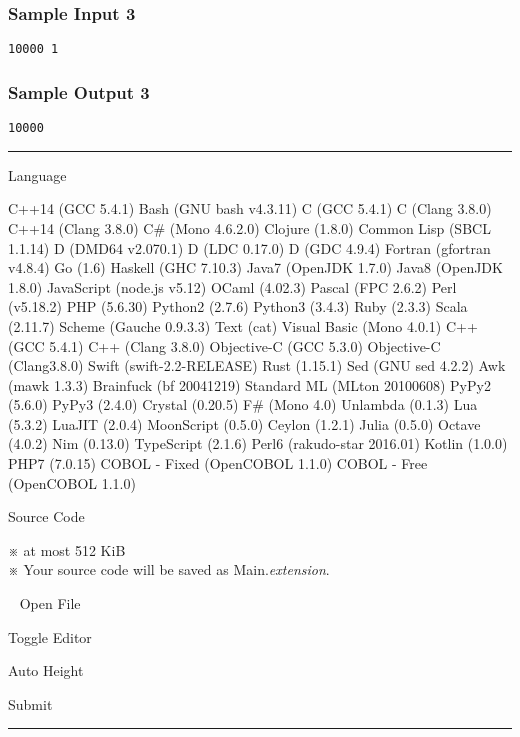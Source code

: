 \subsubsection{Sample Input 3}

\begin{verbatim}
10000 1
\end{verbatim}

\subsubsection{Sample Output 3}

\begin{verbatim}
10000
\end{verbatim}

\begin{center}\rule{0.5\linewidth}{\linethickness}\end{center}

Language

C++14 (GCC 5.4.1) Bash (GNU bash v4.3.11) C (GCC 5.4.1) C (Clang 3.8.0)
C++14 (Clang 3.8.0) C\# (Mono 4.6.2.0) Clojure (1.8.0) Common Lisp (SBCL
1.1.14) D (DMD64 v2.070.1) D (LDC 0.17.0) D (GDC 4.9.4) Fortran
(gfortran v4.8.4) Go (1.6) Haskell (GHC 7.10.3) Java7 (OpenJDK 1.7.0)
Java8 (OpenJDK 1.8.0) JavaScript (node.js v5.12) OCaml (4.02.3) Pascal
(FPC 2.6.2) Perl (v5.18.2) PHP (5.6.30) Python2 (2.7.6) Python3 (3.4.3)
Ruby (2.3.3) Scala (2.11.7) Scheme (Gauche 0.9.3.3) Text (cat) Visual
Basic (Mono 4.0.1) C++ (GCC 5.4.1) C++ (Clang 3.8.0) Objective-C (GCC
5.3.0) Objective-C (Clang3.8.0) Swift (swift-2.2-RELEASE) Rust (1.15.1)
Sed (GNU sed 4.2.2) Awk (mawk 1.3.3) Brainfuck (bf 20041219) Standard ML
(MLton 20100608) PyPy2 (5.6.0) PyPy3 (2.4.0) Crystal (0.20.5) F\# (Mono
4.0) Unlambda (0.1.3) Lua (5.3.2) LuaJIT (2.0.4) MoonScript (0.5.0)
Ceylon (1.2.1) Julia (0.5.0) Octave (4.0.2) Nim (0.13.0) TypeScript
(2.1.6) Perl6 (rakudo-star 2016.01) Kotlin (1.0.0) PHP7 (7.0.15) COBOL -
Fixed (OpenCOBOL 1.1.0) COBOL - Free (OpenCOBOL 1.1.0)

Source Code

※ at most 512 KiB\\
※ Your source code will be saved as Main.\emph{extension}.

~ Open File

Toggle Editor

Auto Height

Submit

\begin{center}\rule{0.5\linewidth}{\linethickness}\end{center}

